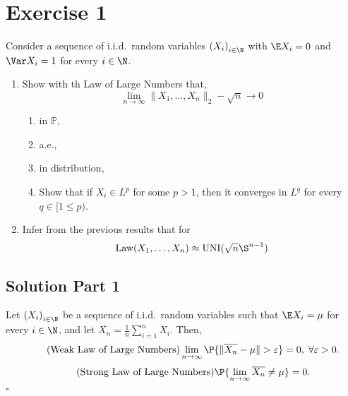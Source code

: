 
\section{Exercise 1}
Consider a sequence of i.i.d.~random variables ${(X_i)}_{i\in\N}$ with $\E X_i = 0$ and $\Var X_i = 1$ for every $i\in \N$.

\begin{enumerate}
    \item Show with th Law of Large Numbers that,
    \[ \lim_{n\to\infty} \|X_1,\ldots,X_n\|_2 - \sqrt{n} \to 0 \]
    \begin{enumerate}[label=(\alph*)]
        \item in $\mathbb{P}$,
        \item a.e.,
        \item in distribution,
        \item Show that if $X_i \in L^p$ for some $p>1$, then it converges in $L^q$ for every $q \in [1\leq p)$.
    \end{enumerate} 
    \item Infer from the previous results that for
    \[ \text{Law}(X_1 , \ldots, X_n) \approx \text{UNI}(\sqrt{n} \S^{n-1}) \]
\end{enumerate}

\subsection*{Solution Part 1}

\begin{theorem}\label{loln}
Let ${(X_i)}_{i\in\N}$ be a sequence of i.i.d.~random variables such that $\E X_i = \mu$ for every $i\in\N$, and let $\overline{X_n} = \frac{1}{n} \sum_{i = 1}^n X_i$. Then,
\begin{equation}\label{wloln}\tag{Weak Law of Large Numbers}
    \lim_{n\to\infty} \P\{\|\overline{X_n} - \mu\| > \varepsilon\} = 0,\;\forall \varepsilon > 0.
\end{equation}
\begin{equation}\label{sloln}\tag{Strong Law of Large Numbers}
    \P\{\lim_{n\to\infty} \overline{X_n} \neq \mu\} = 0.
\end{equation}
\hfill $\square$
\end{theorem}

